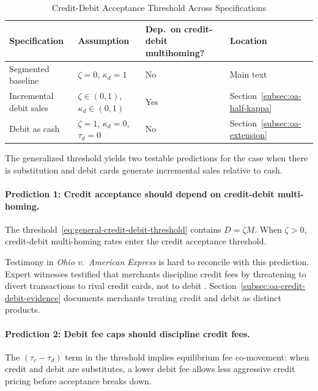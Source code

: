 \documentclass[main.tex]{subfiles}
\begin{document}
\begin{table}[ht]
    \centering
    \caption{Credit-Debit Acceptance Threshold Across Specifications}
    \label{tab:threshold-cases}
    \small
    \begin{tabular}{l l p{2.8cm} l}
        \toprule
        \textbf{Specification} & \textbf{Assumption} & \textbf{Dep.\ on credit-debit multihoming?} & \textbf{Location} \\
        \midrule
        Segmented baseline
          & $\zeta{=}0$, $\kappa_d{=}1$
          & No
          & Main text \\[6pt]
        Incremental debit sales
          & $\zeta \in (0,1)$, $\kappa_d \in (0,1)$
          & Yes
          & Section~\ref{subsec:oa-half-kappa} \\[6pt]
        Debit as cash
          & $\zeta{=}1$, $\kappa_d{=}0$, $\tau_d{=}0$
          & No
          & Section~\ref{subsec:oa-extension} \\
        \bottomrule
    \end{tabular}
\end{table}

The generalized threshold yields two testable predictions for the case when there is substitution and debit cards generate incremental sales relative to cash.

\paragraph{Prediction 1: Credit acceptance should depend on credit-debit multi-homing.}
The threshold~\eqref{eq:general-credit-debit-threshold} contains $D = \zeta M$.
When $\zeta > 0$, credit-debit multi-homing rates enter the credit acceptance threshold.

Testimony in \emph{Ohio v.\ American Express} is hard to reconcile with this prediction.
Expert witnesses testified that merchants discipline credit fees by threatening to divert transactions to rival credit cards, not to debit \parencite{Conrath2014}.
Section~\ref{subsec:oa-credit-debit-evidence} documents merchants treating credit and debit as distinct products.

\paragraph{Prediction 2: Debit fee caps should discipline credit fees.}
The $(\tau_c - \tau_d)$ term in the threshold implies equilibrium fee co-movement: when credit and debit are substitutes, a lower debit fee allows less aggressive credit pricing before acceptance breaks down.
\end{document}
